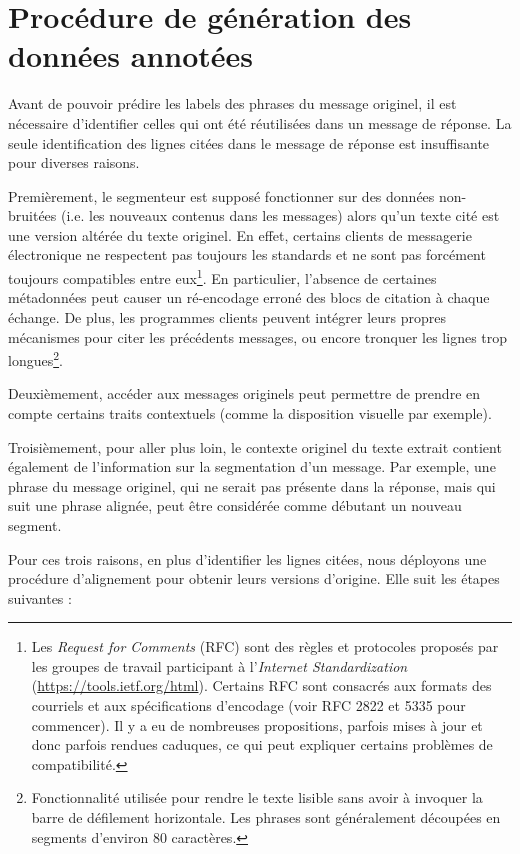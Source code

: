 \section{Procédure de génération des données annotées}

Avant de pouvoir prédire les labels des phrases du message originel, il est nécessaire d'identifier celles qui ont été réutilisées dans un message de réponse. La seule identification des lignes citées dans le message de réponse est insuffisante pour diverses raisons.

Premièrement, le segmenteur est supposé fonctionner sur des données non-bruitées (i.e. les nouveaux contenus dans les messages) alors qu'un texte cité est une version altérée du texte originel. En effet, certains clients de messagerie électronique ne respectent pas toujours les standards et ne sont pas forcément toujours compatibles entre eux\footnote{Les \textit{Request for Comments} (RFC) sont des règles et protocoles proposés par les groupes de travail participant à l'\textit{Internet Standardization} (\url{https://tools.ietf.org/html}). Certains RFC sont consacrés aux formats des courriels et aux spécifications d'encodage (voir RFC 2822 et 5335 pour commencer). Il y a eu de nombreuses propositions, parfois mises à jour et donc parfois rendues caduques, ce qui peut expliquer certains problèmes de compatibilité.}. En particulier, l'absence de certaines métadonnées peut causer un ré-encodage erroné des blocs de citation à chaque échange. De plus, les programmes clients peuvent intégrer leurs propres mécanismes pour citer les précédents messages, ou encore tronquer les lignes trop longues\footnote{Fonctionnalité utilisée pour rendre le texte lisible sans avoir à invoquer la barre de défilement horizontale. Les phrases sont généralement découpées en segments d'environ 80 caractères.}.

Deuxièmement, accéder aux messages originels peut permettre de prendre en compte certains traits contextuels (comme la disposition visuelle par exemple).

Troisièmement, pour aller plus loin, le contexte originel du texte extrait contient également de l'information sur la segmentation d'un message. Par exemple, une phrase du message originel, qui ne serait pas présente dans la réponse, mais qui suit une phrase alignée, peut être considérée comme débutant un nouveau segment.

Pour ces trois raisons, en plus d'identifier les lignes citées, nous déployons une procédure d'alignement pour obtenir leurs versions d'origine. Elle suit les étapes suivantes :

